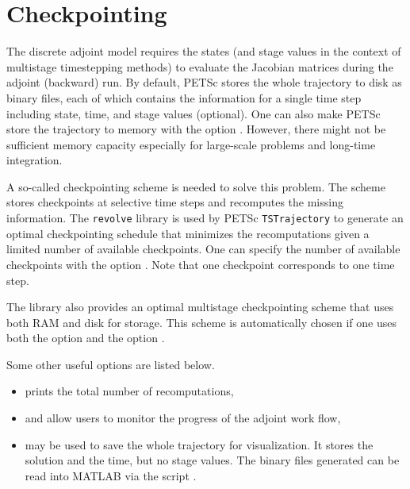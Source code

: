 {\section{Checkpointing}

The discrete adjoint model requires the states (and stage values
in the context of multistage timestepping methods) to evaluate the
Jacobian matrices during the adjoint (backward) run. By default,
PETSc stores the whole trajectory to disk as binary files, each of
which contains the information for a single time step including
state, time, and stage values (optional). One can also make PETSc
store the trajectory to memory with the option .
However, there might not be sufficient memory capacity especially
for large-scale problems and long-time integration.

A so-called checkpointing scheme is needed to solve this problem.
The scheme stores checkpoints at selective time steps and recomputes
the missing information. The \lstinline{revolve} library is used by PETSc
\lstinline{TSTrajectory} to generate an optimal checkpointing schedule that
minimizes the recomputations given a limited number of available
checkpoints. One can specify the number of available checkpoints
with the option .
Note that one checkpoint corresponds to one time step.

The  library also provides an optimal multistage
checkpointing scheme that uses both RAM and disk for storage.
This scheme is automatically chosen if one uses both the option 
and the option .

Some other useful options are listed below.
\begin{itemize}
\item {} prints the total number of recomputations,
\item {} and  allow users to monitor the progress of the adjoint work flow,
\item {} may be used to save the whole trajectory for visualization. It stores the solution and the time, but no stage values. The binary files generated can be read into MATLAB via the script .
\end{itemize}

}
